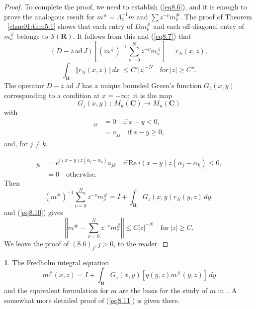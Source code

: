 \documentclass{surv-l}
\theoremstyle{plain}
\theoremstyle{definition}
\newtheorem{remark}[theorem]{\sc{Remark}}
\numberwithin{equation}{chapter}
\begin{document}
\begin{proof}
To complete the proof, we need to establish (\ref{eq8.6}), and it is enough to prove the analogous result for $m^{\#}=\Lambda_{z}^{-1}m$ and $\displaystyle \sum z^{-\nu}m_{\nu}^{\#}$. The proof of Theorem ~\ref{chap01:thm5.1} shows that each entry of $Dm_{\nu}^{\#}$ and each off-diagonal entry of $ m_{\nu}^{\#}$ belongs to $\mathscr{S}(\mathbf{R})$. It follows from this and (\ref{eq8.7}) that
\begin{equation}\label{eq8.9}
(D-z\, \mathrm{ad}\, J)\left[(m^{\#})^{-1}\sum_{\nu=0}^{N}z^{-\nu}m_{\nu}^{\#}\right]=r_{N}(x, z),
\end{equation}
\begin{equation}\label{eq8.10}
\int_{\mathbf{R}}\Vert r_{N}(x, z)\Vert\, dx\ \leq C'|z|^{-N}\quad \mathrm{for}\ |z|\geq C''.
\end{equation}
The operator $D-z$ ad $J$ has a unique bounded Green's function $G_{z}(x, y)$ corresponding to a condition at $x=-\infty;$ it is the map
\begin{equation*}
G_{z}(x, y)\, :\, M_{n}(\mathbf{C})\rightarrow M_{n}(\mathbf{C})
\end{equation*}
with
\begin{align*}
[G_{z}(x, y)a]_{jj}&=0\quad \mathrm{if}\ x-y<0,\\
&=a_{jj}\quad \mathrm{if}\  x-y\geq 0,
\end{align*}
and, for $j\neq k$,

\begin{align*}
[G_{z}(x, y)a]_{jk}&=e^{i(x-y)z(\alpha_{j}-\alpha_{k})}a_{jk}\quad \mathrm{if}\, \mathrm{Re}\ i(x-y)z(\alpha_{j}-\alpha_{k})\leq 0,\\
&=0\quad \mathrm{otherwise}.
\end{align*}
Then
\begin{equation*}
(m^{\#})^{-1}\sum_{\nu=0}^{N}z^{-\nu}m_{\nu}^{\#}=I+\int_{\mathbf{R}}G_{z}(x, y)r_{N}(y, z)\, dy,
\end{equation*}
and (\ref{eq8.10}) gives
\begin{equation}\label{eq8.11}
\left\Vert m^{\#}-\sum_{\nu=0}^{N}z^{-\nu}m_{\nu}^{\#}\right\Vert\leq C|z|^{-N}\quad \mathrm{for}\ |z|\geq C.
\end{equation}
We leave the proof of $(8.6)_{j}, j>0$, to the reader.
\end{proof}
\setcounter{theorem}{11}
\begin{remark}\label{rem8.12}
The Fredholm integral equation
\setcounter{equation}{12}
\begin{equation}\label{eq8.13}
m^{\#}(x,z)=I+\displaystyle \int_{\mathbf{R}}G_{z}(x, y)[q(y, z)m^{\#}(y, z)]\,dy
\end{equation}
and the equivalent formulation for $m$ are the basis for the study of $m$ in~\cite{Be}. A somewhat more detailed proof of (\ref{eq8.11}) is given there.
\end{remark}
\end{document}
